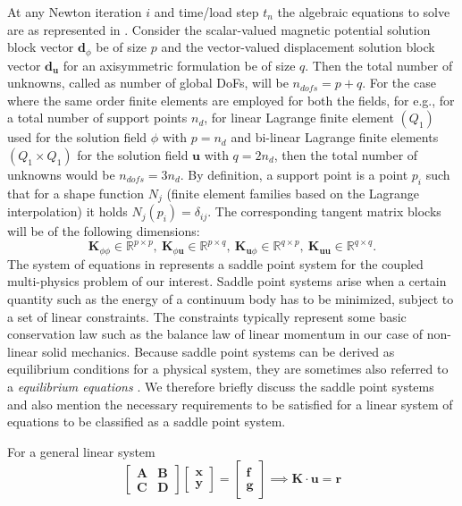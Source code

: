 \documentclass[11pt,a4paper,final]{article}
\begin{document}
At any Newton iteration $i$ and time/load step $t_n$ the algebraic equations to solve are as represented in . Consider the scalar-valued magnetic potential solution block vector $\mathbf{d}_{\phi}$ be of size $p$ and the vector-valued displacement solution block vector $\mathbf{d}_{\mathbf{u}}$ for an axisymmetric formulation be of size $q$. Then the total number of unknowns, called as number of global DoFs, will be $n_{dofs} = p + q$. For the case where the same order finite elements are employed for both the fields, for e.g., for a total number of support points $n_d$, for linear Lagrange finite element $(Q_1)$ used for the solution field $\phi$ with $p = n_d$ and bi-linear Lagrange finite elements $(Q_1 \times Q_1)$ for the solution field $\mathbf{u}$ with $q = 2 n_d$, then the total number of unknowns would be $n_{dofs} = 3 n_d$. By definition, a support point is a point $p_i$ such that for a shape function $N_j$ (finite element families based on the Lagrange interpolation) it holds $N_j (p_i) = \delta_{ij}$. The corresponding tangent matrix blocks will be of the following dimensions:
\begin{equation}
\mathbf{K}_{\phi \phi} \in \mathbb{R}^{p \times p}, \ \mathbf{K}_{\phi \mathbf{u}} \in \mathbb{R}^{p \times q}, \ \mathbf{K}_{\mathbf{u} \phi} \in \mathbb{R}^{q \times p}, \ \mathbf{K}_{\mathbf{u} \mathbf{u}} \in \mathbb{R}^{q \times q}.
\end{equation}
The system of equations in  represents a saddle point system for the coupled multi-physics problem of our interest. Saddle point systems arise when a certain quantity such as the energy of a continuum body has to be minimized, subject to a set of linear constraints. The constraints typically represent some basic conservation law such as the balance law of linear momentum in our case of non-linear solid mechanics. Because saddle point systems can be derived as equilibrium conditions for a physical system, they are sometimes also referred to a \textit{equilibrium equations} \cite{Benzi2005}. We therefore briefly discuss the saddle point systems and also mention the necessary requirements to be satisfied for a linear system of equations to be classified as a saddle point system. \newline \par 
For a general linear system 
\begin{equation}
\begin{bmatrix}
\mathbf{A} & \mathbf{B} \\
\mathbf{C} & \mathbf{D}
\end{bmatrix}
\begin{bmatrix}
\mathbf{x} \\
\mathbf{y}
\end{bmatrix}
=
\begin{bmatrix}
\mathbf{f} \\
\mathbf{g}
\end{bmatrix}
\implies \mathbf{K} \cdot \mathbf{u} = \mathbf{r}
\label{eq:3.11}
\end{equation}
\end{document}
